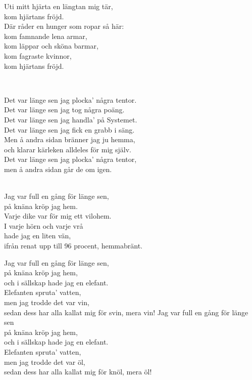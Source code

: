 Uti mitt hjärta en längtan mig tär,\\
kom hjärtans fröjd.\\
Där råder en hunger som ropar så här:\\
kom famnande lena armar,\\
kom läppar och sköna barmar,\\
kom fagraste kvinnor,\\
kom hjärtans fröjd.

\newpage

 \\       

\songtext{}
Det var länge sen jag plocka' några tentor.\\
Det var länge sen jag tog några poäng.\\
Det var länge sen jag handla' på Systemet.\\
Det var länge sen jag fick en grabb i säng.\\
Men å andra sidan bränner jag ju hemma,\\
och klarar kärleken alldeles för mig själv.\\
Det var länge sen jag plocka' några tentor,\\
men å andra sidan går de om igen. \\

 \\       

\songtext{}
Jag var full en gång för länge sen,\\
på knäna kröp jag hem.\\
Varje dike var för mig ett vilohem.\\
I varje hörn och varje vrå\\
hade jag en liten vän,\\
ifrån renat upp till 96 procent, hemmabränt.

Jag var full en gång för länge sen,\\
på knäna kröp jag hem,\\
och i sällskap hade jag en elefant.\\
Elefanten spruta' vatten,\\
men jag trodde det var vin,\\
sedan dess har alla kallat mig för svin, mera vin!
\newpage
Jag var full en gång för länge sen\\
på knäna kröp jag hem,\\
och i sällskap hade jag en elefant.\\
Elefanten spruta' vatten,\\
men jag trodde det var öl,\\
sedan dess har alla kallat mig för knöl, mera öl!

